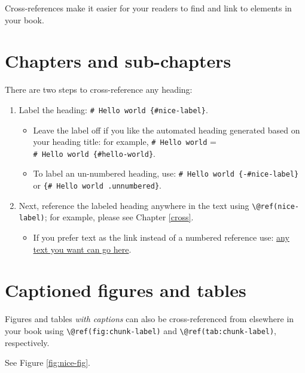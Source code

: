 \documentclass[
]{book}
\providecommand{\tightlist}{%
  \setlength{\itemsep}{0pt}\setlength{\parskip}{0pt}}
\begin{document}
Cross-references make it easier for your readers to find and link to elements in your book.

\hypertarget{chapters-and-sub-chapters}{%
\section{Chapters and sub-chapters}\label{chapters-and-sub-chapters}}

There are two steps to cross-reference any heading:

\begin{enumerate}
\def\labelenumi{\arabic{enumi}.}
\tightlist
\item
  Label the heading: \texttt{\#\ Hello\ world\ \{\#nice-label\}}.

  \begin{itemize}
  \tightlist
  \item
    Leave the label off if you like the automated heading generated based on your heading title: for example, \texttt{\#\ Hello\ world} = \texttt{\#\ Hello\ world\ \{\#hello-world\}}.
  \item
    To label an un-numbered heading, use: \texttt{\#\ Hello\ world\ \{-\#nice-label\}} or \texttt{\{\#\ Hello\ world\ .unnumbered\}}.
  \end{itemize}
\item
  Next, reference the labeled heading anywhere in the text using \texttt{\textbackslash{}@ref(nice-label)}; for example, please see Chapter \ref{cross}.

  \begin{itemize}
  \tightlist
  \item
    If you prefer text as the link instead of a numbered reference use: \protect\hyperlink{cross}{any text you want can go here}.
  \end{itemize}
\end{enumerate}

\hypertarget{captioned-figures-and-tables}{%
\section{Captioned figures and tables}\label{captioned-figures-and-tables}}

Figures and tables \emph{with captions} can also be cross-referenced from elsewhere in your book using \texttt{\textbackslash{}@ref(fig:chunk-label)} and \texttt{\textbackslash{}@ref(tab:chunk-label)}, respectively.

See Figure \ref{fig:nice-fig}.
\end{document}
